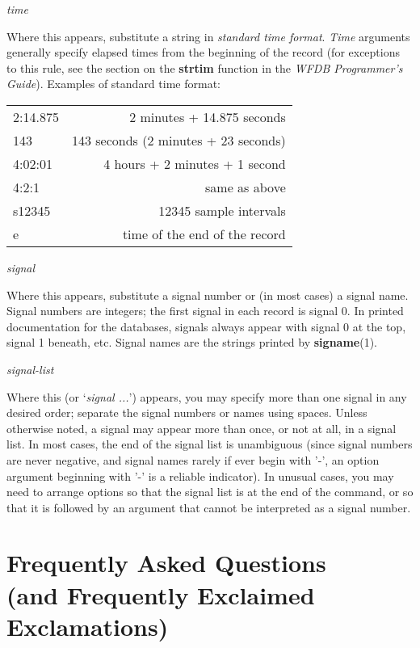 \documentclass[twoside]{book}
\begin{document}
\begin{description}
\item{\textit{time}}

Where this appears, substitute a string in \textit{standard time format}.
\textit{Time} arguments generally specify elapsed times from the beginning
of the record (for exceptions to this rule, see the section on the
\textbf{strtim} function in the \textit{WFDB Programmer's Guide}).  Examples
of standard time format:

\begin{center}
\begin{tabular}{lr}
2:14.875 & 2 minutes + 14.875 seconds \\
143 & 143 seconds (2 minutes + 23 seconds) \\
4:02:01 & 4 hours + 2 minutes + 1 second \\
4:2:1 & same as above \\
s12345 & 12345 sample intervals \\
e & time of the end of the record \\
\end{tabular}
\end{center}

\item{\textit{signal}}

Where this appears, substitute a signal number or (in most cases) a signal name.
Signal numbers are integers;  the first signal in each record is signal 0.
In printed documentation for the databases, signals always appear with signal 0
at the top, signal 1 beneath, etc.  Signal names are the strings printed by
\textbf{signame}(1).

\item{\textit{signal-list}}

Where this (or `\textit{signal ...}') appears, you may specify more than one
signal in any desired order; separate the signal numbers or names using spaces.
Unless otherwise noted, a signal may appear more than once, or not at all, in a
signal list. In most cases, the end of the signal list is unambiguous (since
signal numbers are never negative, and signal names rarely if ever begin with
'-', an option argument beginning with '-' is a reliable indicator). In unusual
cases, you may need to arrange options so that the signal list is at the end of
the command, or so that it is followed by an argument that cannot be
interpreted as a signal number.
\end{description}

\chapter*{Frequently Asked Questions\\(and Frequently Exclaimed Exclamations)}
\end{document}
